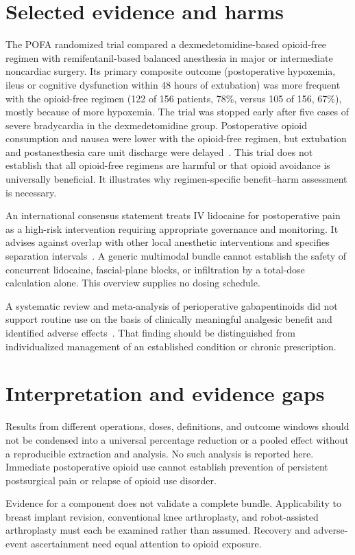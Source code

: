 \documentclass[11pt]{article}
\begin{document}
\section{Selected evidence and harms}
The POFA randomized trial compared a dexmedetomidine-based opioid-free regimen with remifentanil-based balanced anesthesia in major or intermediate noncardiac surgery. Its primary composite outcome (postoperative hypoxemia, ileus or cognitive dysfunction within 48 hours of extubation) was more frequent with the opioid-free regimen (122 of 156 patients, 78\%, versus 105 of 156, 67\%), mostly because of more hypoxemia. The trial was stopped early after five cases of severe bradycardia in the dexmedetomidine group. Postoperative opioid consumption and nausea were lower with the opioid-free regimen, but extubation and postanesthesia care unit discharge were delayed~\cite{pofa}. This trial does not establish that all opioid-free regimens are harmful or that opioid avoidance is universally beneficial. It illustrates why regimen-specific benefit--harm assessment is necessary.

An international consensus statement treats IV lidocaine for postoperative pain as a high-risk intervention requiring appropriate governance and monitoring. It advises against overlap with other local anesthetic interventions and specifies separation intervals~\cite{foo}. A generic multimodal bundle cannot establish the safety of concurrent lidocaine, fascial-plane blocks, or infiltration by a total-dose calculation alone. This overview supplies no dosing schedule.

A systematic review and meta-analysis of perioperative gabapentinoids did not support routine use on the basis of clinically meaningful analgesic benefit and identified adverse effects~\cite{verret}. That finding should be distinguished from individualized management of an established condition or chronic prescription.
\section{Interpretation and evidence gaps}
Results from different operations, doses, definitions, and outcome windows should not be condensed into a universal percentage reduction or a pooled effect without a reproducible extraction and analysis. No such analysis is reported here. Immediate postoperative opioid use cannot establish prevention of persistent postsurgical pain or relapse of opioid use disorder.

Evidence for a component does not validate a complete bundle. Applicability to breast implant revision, conventional knee arthroplasty, and robot-assisted arthroplasty must each be examined rather than assumed. Recovery and adverse-event ascertainment need equal attention to opioid exposure.
\end{document}
